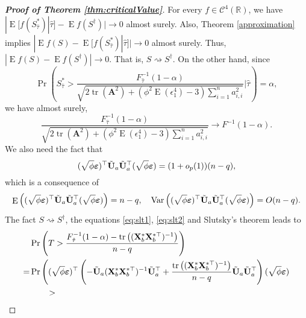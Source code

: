 \documentclass[11pt]{article}
\DeclareMathOperator{\mytr}{tr}
\DeclareMathOperator{\myE}{E}
\DeclareMathOperator{\myVar}{Var}
\newcommand{\BA}{\mathbf{A}}    \newcommand{\BB}{\mathbf{B}}    \newcommand{\BC}{\mathbf{C}}    \newcommand{\BD}{\mathbf{D}}    \newcommand{\BE}{\mathbf{E}}    \newcommand{\BF}{\mathbf{F}}    \newcommand{\BG}{\mathbf{G}}    \newcommand{\BH}{\mathbf{H}}    \newcommand{\BI}{\mathbf{I}}    \newcommand{\BJ}{\mathbf{J}}    \newcommand{\BK}{\mathbf{K}}    \newcommand{\BL}{\mathbf{L}}
\theoremstyle{plain}
\theoremstyle{definition}
\theoremstyle{remark}
\begin{document}
\begin{appendices}
\begin{proof}[\textbf{Proof of Theorem \ref{thm:criticalValue}}]
    For every $f\in \mathscr C^4 (\mathbb R)$,
    we have $| \myE [f(S^*_{\hat \tau}) |\hat\tau] - \myE f(S^\dagger) |\to 0$ almost surely.
    Also, Theorem \ref{approximation} implies
        $|\myE f(S)- \myE [f(S^*_{\hat \tau})|\hat\tau] |\to 0$ almost surely.
        Thus, $|\myE f(S)- \myE f(S^\dagger) |\to 0$.
        That is, $S\rightsquigarrow S^\dagger$.
        On the other hand, since
    \begin{equation*}
        \Pr\left(
            S_{\hat \tau}^*
            >
            \frac{F^{-1}_{\hat \tau} (1-\alpha)}{
            \sqrt{
    2 \mytr(\BA^2)
    +
    ( \phi^2 \myE (\epsilon_1^4)-3) \sum_{i=1}^n a_{i,i}^2
            }             
    }
\Bigg | \hat{\tau} \right)=\alpha,
    \end{equation*}
    we have almost surely,
    \begin{equation}\label{eq:slt1}
            \frac{F^{-1}_{\hat \tau} (1-\alpha)}{
            \sqrt{
    2 \mytr(\BA^2)
    +
    ( \phi^2 \myE (\epsilon_1^4)-3) \sum_{i=1}^n a_{i,i}^2
            }             
    }
    \to F^{-1}(1-\alpha).
    \end{equation}
We also need the fact that
\begin{equation}
    (\sqrt \phi \boldsymbol{\varepsilon})^\top 
    \tilde {\mathbf{U}}_a \tilde {\mathbf{U}}_a^\top
(\sqrt \phi \boldsymbol{\varepsilon})
=
(1+o_p(1))(n-q),
    \label{eq:slt2}
\end{equation}
which is a consequence of
\begin{equation*}
    \myE\left(  (\sqrt \phi \bepsilon)^\top 
    \tilde \BU_a \tilde \BU_a^\top
(\sqrt \phi \bepsilon)
\right)
=n-q
,\quad
    \myVar\left(  (\sqrt \phi \bepsilon)^\top 
    \tilde \BU_a \tilde \BU_a^\top
(\sqrt \phi \bepsilon)
\right)
=O(n-q)
    .
\end{equation*}
The fact $S\rightsquigarrow S^\dagger$, the equations \eqref{eq:slt1}, \eqref{eq:slt2} and Slutsky's theorem leads to
\begin{align*}
            &\Pr\left( T > \frac{F^{-1}_{\hat \tau} (1-\alpha)-\mytr\left( (\BX_b^* \BX_b^{*\top})^{-1}  \right)}{n-q} \right)
            \\
            =&\Pr
            \Bigg( 
                (\sqrt \phi \bepsilon)^\top \left( -  \tilde \BU_a (\BX_b^* \BX_b^{*\top})^{-1} \tilde \BU_a^\top 
            +\frac{
\mytr\left( (\BX_b^* \BX_b^{*\top})^{-1}  \right)
}{n-q}
\tilde \BU_a  \tilde \BU_a^\top
 \right) 
(\sqrt \phi \bepsilon)
            \\
            &
            \quad
            \quad
            >

\end{align*}
\end{proof}
\end{appendices}
\end{document}
